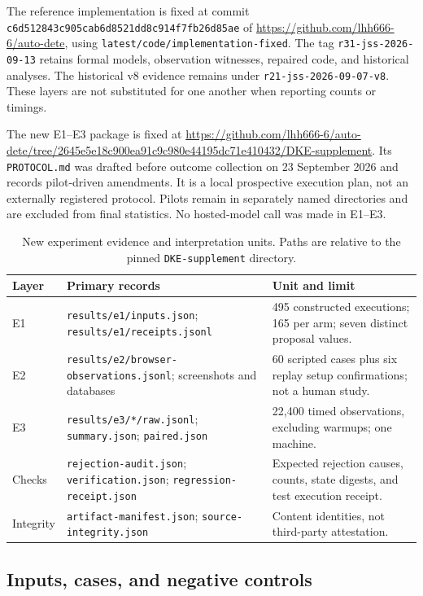 \documentclass[11pt,a4paper]{article}
\newcommand{\code}[1]{\nolinkurl{#1}}
\begin{document}
The reference implementation is fixed at commit \code{c6d512843c905cab6d8521dd8c914f7fb26d85ae} of \url{https://github.com/lhh666-6/auto-dete}, using \code{latest/code/implementation-fixed}. The tag \code{r31-jss-2026-09-13} retains formal models, observation witnesses, repaired code, and historical analyses. The historical v8 evidence remains under \code{r21-jss-2026-09-07-v8}. These layers are not substituted for one another when reporting counts or timings.

The new E1--E3 package is fixed at \url{https://github.com/lhh666-6/auto-dete/tree/2645e5e18c900ea91c9c980e44195dc71e410432/DKE-supplement}. Its \code{PROTOCOL.md} was drafted before outcome collection on 23 September 2026 and records pilot-driven amendments. It is a local prospective execution plan, not an externally registered protocol. Pilots remain in separately named directories and are excluded from final statistics. No hosted-model call was made in E1--E3.

\begin{table}[htbp]
\centering\small
\caption{New experiment evidence and interpretation units. Paths are relative to the pinned \code{DKE-supplement} directory.}
\begin{tabularx}{\textwidth}{@{}l>{\raggedright\arraybackslash}p{}X@{}}
\toprule
Layer & Primary records & Unit and limit \\
\midrule
E1 & \code{results/e1/inputs.json}; \code{results/e1/receipts.jsonl} & 495 constructed executions; 165 per arm; seven distinct proposal values. \\
E2 & \code{results/e2/browser-observations.jsonl}; screenshots and databases & 60 scripted cases plus six replay setup confirmations; not a human study. \\
E3 & \code{results/e3/*/raw.jsonl}; \code{summary.json}; \code{paired.json} & 22,400 timed observations, excluding warmups; one machine. \\
Checks & \code{rejection-audit.json}; \code{verification.json}; \code{regression-receipt.json} & Expected rejection causes, counts, state digests, and test execution receipt. \\
Integrity & \code{artifact-manifest.json}; \code{source-integrity.json} & Content identities, not third-party attestation. \\
\bottomrule
\end{tabularx}
\end{table}

\subsection{Inputs, cases, and negative controls}
\end{document}
